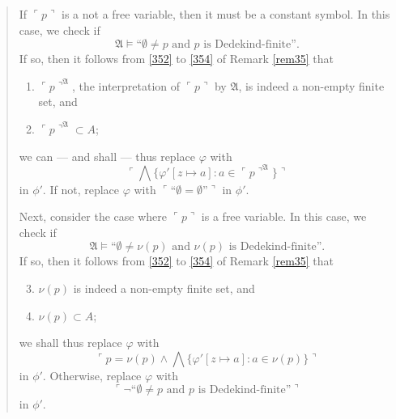 \documentclass[12pt, twoside]{memoir}
\numberwithin{equation}{section}
\theoremstyle{definition}
\theoremstyle{remark}
\theoremstyle{definition}
\theoremstyle{definition}
\theoremstyle{definition}
\theoremstyle{remark}
\begin{document}
\begin{quote}
\begin{enumerate}[label=(\arabic*)]
\begin{enumerate}[label=(F\arabic*), leftmargin=30pt]
            If $\ulcorner p \urcorner$ is a not a free variable, then it must be a constant symbol. In this case, we check if 
            \begin{equation*}
                \mathfrak{A} \models \text{``}\emptyset \neq p \text{ and } p \text{ is Dedekind-finite''.}
            \end{equation*}
            If so, then it follows from \ref{352} to \ref{354} of Remark \ref{rem35} that 
            \begin{enumerate}[label=(\alph*)]
                \item $\ulcorner p \urcorner^{\mathfrak{A}}$, the interpretation of $\ulcorner p \urcorner$ by $\mathfrak{A}$, is indeed a non-empty finite set, and
                \item $\ulcorner p \urcorner^{\mathfrak{A}} \subset A$;
            \end{enumerate}
            we can --- and shall --- thus replace $\varphi$ with 
            \begin{equation*}
                \ulcorner \bigwedge \{\varphi'[z \mapsto a] : a \in \ulcorner p \urcorner^{\mathfrak{A}}\} \urcorner
            \end{equation*}
            in $\phi'$. If not, replace $\varphi$ with $\ulcorner \text{``} \emptyset = \emptyset \text{''} \urcorner$ in $\phi'$. 
        
            Next, consider the case where $\ulcorner p \urcorner$ is a free variable. In this case, we check if
            \begin{equation*}
                \mathfrak{A} \models \text{``}\emptyset \neq \nu(p) \text{ and } \nu(p) \text{ is Dedekind-finite''.}
            \end{equation*}
            If so, then it follows from \ref{352} to \ref{354} of Remark \ref{rem35} that 
            \begin{enumerate}[label=(\alph*)]
                \setcounter{enumiii}{2}
                \item $\nu(p)$ is indeed a non-empty finite set, and
                \item $\nu(p) \subset A$;
            \end{enumerate} 
            we shall thus replace $\varphi$ with 
            \begin{equation*}
                \ulcorner p = \nu(p) \wedge \bigwedge \{\varphi'[z \mapsto a] : a \in \nu(p)\} \urcorner
            \end{equation*}
            in $\phi'$. Otherwise, replace $\varphi$ with 
            \begin{equation*}
                \ulcorner \neg \text{``}\emptyset \neq p \text{ and } p \text{ is Dedekind-finite''} \urcorner
            \end{equation*}
            in $\phi'$.
            

\end{enumerate}
\end{enumerate}
\end{quote}
\end{document}
